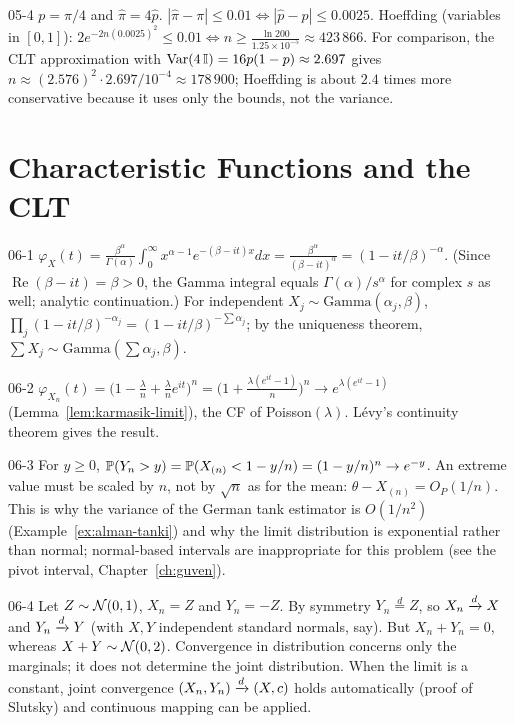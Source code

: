 \begin{solution}{05-4}
$p=\pi/4$ and $\hat\pi=4\hat p$. $|\hat\pi-\pi|\le0.01\iff|\hat p-p|\le0.0025$. Hoeffding (variables in $[0,1]$): $2e^{-2n(0.0025)^2}\le0.01\iff n\ge\frac{\ln200}{1.25\times10^{-5}}\approx423\,866$. For comparison, the CLT approximation with $\Var(4\,\I)=16p(1-p)\approx2.697$ gives $n\approx(2.576)^2\cdot2.697/10^{-4}\approx178\,900$; Hoeffding is about $2.4$ times more conservative because it uses only the bounds, not the variance.
\end{solution}

\section{Characteristic Functions and the CLT}

\begin{solution}{06-1}
$\varphi_X(t)=\frac{\beta^\alpha}{\Gamma(\alpha)}\int_0^\infty x^{\alpha-1}e^{-(\beta-it)x}dx=\frac{\beta^\alpha}{(\beta-it)^\alpha}=(1-it/\beta)^{-\alpha}$. (Since $\operatorname{Re}(\beta-it)=\beta>0$, the Gamma integral equals $\Gamma(\alpha)/s^\alpha$ for complex $s$ as well; analytic continuation.) For independent $X_j\sim\text{Gamma}(\alpha_j,\beta)$, $\prod_j(1-it/\beta)^{-\alpha_j}=(1-it/\beta)^{-\sum\alpha_j}$; by the uniqueness theorem, $\sum X_j\sim\text{Gamma}(\sum\alpha_j,\beta)$.
\end{solution}

\begin{solution}{06-2}
$\varphi_{X_n}(t)=\big(1-\frac\lambda n+\frac\lambda ne^{it}\big)^n=\big(1+\frac{\lambda(e^{it}-1)}{n}\big)^n\to e^{\lambda(e^{it}-1)}$ (Lemma~\ref{lem:karmasik-limit}), the CF of Poisson$(\lambda)$. Lévy's continuity theorem gives the result.
\end{solution}

\begin{solution}{06-3}
For $y\ge0$, $\P(Y_n>y)=\P(X_{(n)}<1-y/n)=(1-y/n)^n\to e^{-y}$. An extreme value must be scaled by $n$, not by $\sqrt n$ as for the mean: $\theta-X_{(n)}=O_P(1/n)$. This is why the variance of the German tank estimator is $O(1/n^2)$ (Example~\ref{ex:alman-tanki}) and why the limit distribution is exponential rather than normal; normal-based intervals are inappropriate for this problem (see the pivot interval, Chapter~\ref{ch:guven}).
\end{solution}

\begin{solution}{06-4}
Let $Z\sim\Normal(0,1)$, $X_n=Z$ and $Y_n=-Z$. By symmetry $Y_n\overset d=Z$, so $X_n\dto X$ and $Y_n\dto Y$ (with $X,Y$ independent standard normals, say). But $X_n+Y_n=0$, whereas $X+Y\sim\Normal(0,2)$. Convergence in distribution concerns only the marginals; it does not determine the joint distribution. When the limit is a constant, joint convergence $(X_n,Y_n)\dto(X,c)$ holds automatically (proof of Slutsky) and continuous mapping can be applied.
\end{solution}

